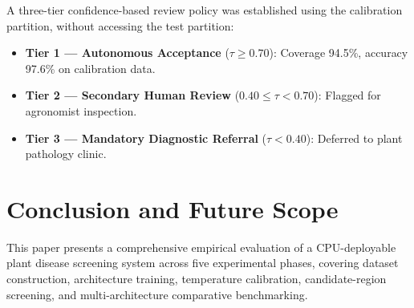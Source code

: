 \documentclass[pdflatex,sn-mathphys-num]{sn-jnl}
\theoremstyle{thmstyleone}%
\theoremstyle{thmstyletwo}%
\theoremstyle{thmstylethree}%
\begin{document}
A three-tier confidence-based review policy was established using the calibration
partition, without accessing the test partition:
\begin{itemize}
  \item \textbf{Tier 1 --- Autonomous Acceptance} ($\tau \geq 0.70$): Coverage 94.5\%,
        accuracy 97.6\% on calibration data.
  \item \textbf{Tier 2 --- Secondary Human Review} ($0.40 \leq \tau < 0.70$):
        Flagged for agronomist inspection.
  \item \textbf{Tier 3 --- Mandatory Diagnostic Referral} ($\tau < 0.40$):
        Deferred to plant pathology clinic.
\end{itemize}


\section{Conclusion and Future Scope}
\label{sec:conclusion}

This paper presents a comprehensive empirical evaluation of a CPU-deployable plant
disease screening system across five experimental phases, covering dataset construction,
architecture training, temperature calibration, candidate-region screening, and
multi-architecture comparative benchmarking.
\end{document}
